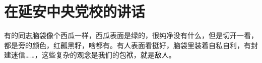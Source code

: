 \section[在延安中央党校的讲话（一九四四年十一月）]{在延安中央党校的讲话}


有的同志脑袋像个西瓜一样，西瓜表面是绿的，很纯净没有什么，但是切开一看，都是旁的颜色，红瓤黑籽，啥都有。有人表面看挺好，脑袋里装着自私自利，有封建迷信……，这些复杂的观念是我们的包袱，就是敌人。

